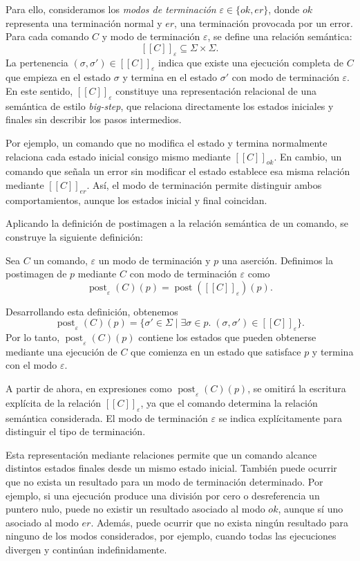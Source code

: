 \documentclass[a4paper,	11pt]{report}
\begin{document}
Para ello, consideramos los \emph{modos de terminación} $\varepsilon \in \{ok, er\}$,
donde $ok$ representa una terminación normal y $er$, una terminación provocada por un error.
Para cada comando $C$ y modo de terminación $\varepsilon$, se define una relación semántica:
$$[\![C]\!]_\varepsilon \subseteq \Sigma \times \Sigma.$$
La pertenencia $(\sigma, \sigma') \in [\![C]\!]_\varepsilon$ indica que existe una ejecución completa de $C$ que empieza en el estado
$\sigma$ y termina en el estado $\sigma'$ con modo de terminación $\varepsilon$.
En este sentido, $[\![C]\!]_\varepsilon$ constituye una representación relacional de una semántica de estilo \emph{big-step},
que relaciona directamente los estados iniciales y finales sin describir los pasos intermedios.

Por ejemplo,
un comando que no modifica el estado y termina normalmente relaciona cada estado inicial consigo mismo mediante $[\![C]\!]_{ok}$.
En cambio,
un comando que señala un error sin modificar el estado establece esa misma relación mediante $[\![C]\!]_{er}$.
Así, el modo de terminación permite distinguir ambos comportamientos,
aunque los estados inicial y final coincidan.

Aplicando la definición de postimagen a la relación semántica de un comando,
se construye la siguiente definición:
\begin{definicion}
\label{def:post-comado}
Sea $C$ un comando, $\varepsilon$ un modo de terminación y $p$ una aserción.
Definimos la postimagen de $p$ mediante $C$ con modo de terminación $\varepsilon$ como
$$\operatorname{post}_\varepsilon(C)(p) = \operatorname{post}([\![C]\!]_\varepsilon)(p).$$
\end{definicion}

Desarrollando esta definición, obtenemos
$$\operatorname{post}_\varepsilon(C)(p) = \{\sigma' \in \Sigma \mid \exists \sigma \in p. \; (\sigma, \sigma') \in [\![C]\!]_\varepsilon\}.$$
Por lo tanto, $\operatorname{post}_\varepsilon(C)(p)$ contiene los estados que pueden obtenerse mediante
una ejecución de $C$ que comienza en un estado que satisface $p$
y termina con el modo $\varepsilon$.

A partir de ahora, en expresiones como $\operatorname{post}_{\varepsilon}(C)(p)$,
se omitirá la escritura explícita de la relación $[\![C]\!]_\varepsilon$,
ya que el comando determina la relación semántica considerada.
El modo de terminación $\varepsilon$ se indica explícitamente para distinguir el tipo de terminación.

Esta representación mediante relaciones permite que un comando
alcance distintos estados finales desde un mismo estado inicial.
También puede ocurrir que no exista un resultado para un modo de terminación determinado.
Por ejemplo, si una ejecución produce una división por cero o desreferencia un puntero nulo,
puede no existir un resultado asociado al modo $ok$, aunque sí uno asociado al modo $er$.
Además, puede ocurrir que no exista ningún resultado para ninguno de los modos considerados,
por ejemplo, cuando todas las ejecuciones divergen y continúan indefinidamente.
\end{document}
